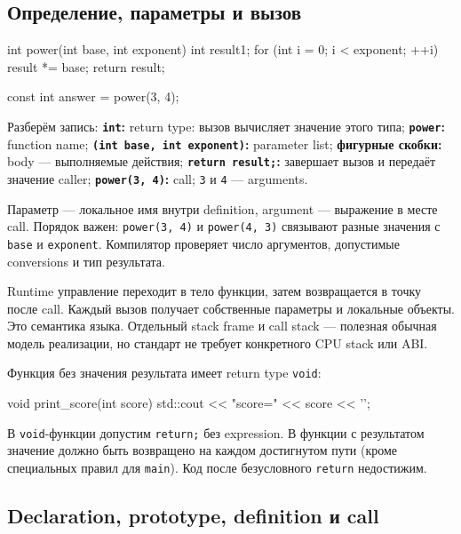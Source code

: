 \subsection{Определение, параметры и вызов}

\begin{cppcode}
int power(int base, int exponent) {
    int result{1};
    for (int i = 0; i < exponent; ++i) {
        result *= base;
    }
    return result;
}

const int answer = power(3, 4);
\end{cppcode}

Разберём запись:
\textbf{\texttt{int}:} return type: вызов вычисляет значение этого типа; \textbf{\texttt{power}:} function name; \textbf{\texttt{(int base, int exponent)}:} parameter list; \textbf{фигурные скобки:} body --- выполняемые действия; \textbf{\texttt{return result;}:} завершает вызов и передаёт значение caller; \textbf{\texttt{power(3, 4)}:} call; \texttt{3} и \texttt{4} --- arguments.

Параметр --- локальное имя внутри definition, argument --- выражение в месте
call. Порядок важен: \texttt{power(3, 4)} и \texttt{power(4, 3)} связывают
разные значения с \texttt{base} и \texttt{exponent}. Компилятор проверяет
число аргументов, допустимые conversions и тип результата.

Runtime управление переходит в тело функции, затем возвращается в точку после
call. Каждый вызов получает собственные параметры и локальные объекты. Это
семантика языка. Отдельный stack frame и call stack --- полезная обычная
модель реализации, но стандарт не требует конкретного CPU stack или ABI.

Функция без значения результата имеет return type \texttt{void}:

\begin{cppcode}
void print_score(int score) {
    std::cout << "score=" << score << '\n';
}
\end{cppcode}

В \texttt{void}-функции допустим \texttt{return;} без expression. В функции с
результатом значение должно быть возвращено на каждом достигнутом пути
(кроме специальных правил для \texttt{main}). Код после безусловного
\texttt{return} недостижим.

\subsection{Declaration, prototype, definition и call}

